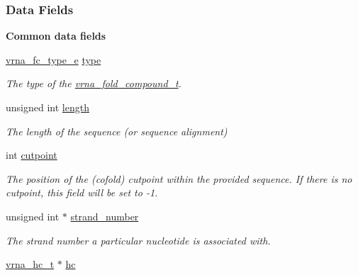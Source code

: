 \subsubsection*{Data Fields}
\begin{Indent}{\bf Common data fields}\par
\begin{DoxyCompactItemize}
\item 
\hyperlink{group__fold__compound_ga01a4ff86fa71deaaa5d1abbd95a1447d}{vrna\+\_\+fc\+\_\+type\+\_\+e} \hyperlink{group__fold__compound_ac5eab693deac9a1a40c2a95ac294707c}{type}
\begin{DoxyCompactList}\small\item\em The type of the \hyperlink{group__fold__compound_ga1b0cef17fd40466cef5968eaeeff6166}{vrna\+\_\+fold\+\_\+compound\+\_\+t}. \end{DoxyCompactList}\item 
unsigned int \hyperlink{group__fold__compound_a95fbfed770b858e50c766505dc4bf998}{length}\hypertarget{group__fold__compound_a95fbfed770b858e50c766505dc4bf998}{}\label{group__fold__compound_a95fbfed770b858e50c766505dc4bf998}

\begin{DoxyCompactList}\small\item\em The length of the sequence (or sequence alignment) \end{DoxyCompactList}\item 
int \hyperlink{group__fold__compound_ae1a7bbff0256577e2b22709bac11fdb4}{cutpoint}\hypertarget{group__fold__compound_ae1a7bbff0256577e2b22709bac11fdb4}{}\label{group__fold__compound_ae1a7bbff0256577e2b22709bac11fdb4}

\begin{DoxyCompactList}\small\item\em The position of the (cofold) cutpoint within the provided sequence. If there is no cutpoint, this field will be set to -\/1. \end{DoxyCompactList}\item 
unsigned int $\ast$ \hyperlink{group__fold__compound_a23304c5186dfae97bc69dc19d37f70c3}{strand\+\_\+number}\hypertarget{group__fold__compound_a23304c5186dfae97bc69dc19d37f70c3}{}\label{group__fold__compound_a23304c5186dfae97bc69dc19d37f70c3}

\begin{DoxyCompactList}\small\item\em The strand number a particular nucleotide is associated with. \end{DoxyCompactList}\item 
\hyperlink{group__hard__constraints_gac7e4c4f8abe3163a68110c5bff24e01d}{vrna\+\_\+hc\+\_\+t} $\ast$ \hyperlink{group__fold__compound_aceaa904dbf50092d403ca99422e8f824}{hc}\hypertarget{group__fold__compound_aceaa904dbf50092d403ca99422e8f824}{}\label{group__fold__compound_aceaa904dbf50092d403ca99422e8f824}


\end{DoxyCompactItemize}
\end{Indent}
